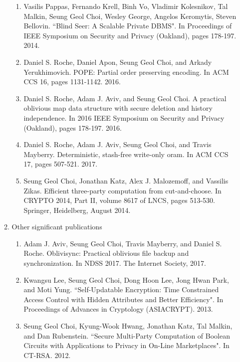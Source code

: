 \documentclass[11pt]{article}
\begin{document}
\begin{enumerate}[label=\textbf{(\alph*)}]
\begin{enumerate}[label=(\roman*)]
\begin{enumerate}[label=\arabic*.]
\item 
Vasilis Pappas, Fernando Krell, Binh Vo, Vladimir Kolesnikov, Tal Malkin, Seung
Geol Choi, Wesley George, Angelos Keromytis, Steven Bellovin.  ``Blind Seer: A
    Scalable Private DBMS".  In Proceedings of IEEE Symposium on Security and 
    Privacy (Oakland), pages 178-197. 2014. 

\item
Daniel S. Roche, Daniel Apon, Seung Geol Choi, and Arkady Yerukhimovich. POPE:
Partial order preserving encoding. In ACM CCS 16, pages 1131-1142.  2016.

\item 
Daniel S. Roche, Adam J. Aviv, and Seung Geol Choi. A practical oblivious map
data structure with secure deletion and history independence. In 2016
IEEE Symposium on Security and Privacy (Oakland), pages 178-197. 2016.


\item 
Daniel S. Roche, Adam J. Aviv, Seung Geol Choi, and Travis Mayberry.
Deterministic, stash-free write-only oram. In ACM CCS 17, pages 507-521. 2017.


\item 
Seung Geol Choi, Jonathan Katz, Alex J. Malozemoff, and Vassilis Zikas.
Efficient three-party computation from cut-and-choose. In CRYPTO 2014,
Part II, volume 8617 of LNCS, pages 513-530. Springer, Heidelberg, August
2014.

\end{enumerate}

\item Other significant publications

\begin{enumerate}[label=\arabic*.]
\item
Adam J. Aviv, Seung Geol Choi, Travis Mayberry, and Daniel S. Roche.
Oblivisync: Practical oblivious file backup and synchronization. In NDSS
2017. The Internet Society, 2017.

\item
Kwangsu Lee, Seung Geol Choi, Dong Hoon Lee, Jong Hwan Park, and Moti Yung.
    ``Self-Updatable Encryption: Time Constrained Access Control with Hidden
    Attributes and Better Efficiency". In Proceedings of  Advances in
    Cryptology (ASIACRYPT). 2013.


\item
Seung Geol Choi, Kyung-Wook Hwang, Jonathan Katz, Tal Malkin, and Dan
Rubenstein.  
``Secure Multi-Party Computation of Boolean Circuits with
Applications to Privacy in On-Line Marketplaces".
In CT-RSA. 2012. 


\end{enumerate}
\end{enumerate}
\end{enumerate}
\end{document}
